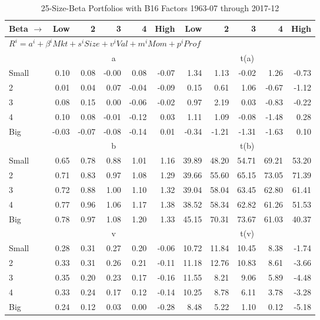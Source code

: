 
\begin{table}[!ht]
\footnotesize
\centering
\caption{25-Size-Beta Portfolios with B16 Factors 1963-07 through 2017-12}
\begin{tabular}{lrrrrrrrrrr}
  \toprule
    
    Beta $\rightarrow$ & Low & 2 & 3 & 4 & High & Low & 2 & 3 & 4 & High  \\ 
  \midrule
  \multicolumn{11}{l}{$R^i=a^i+\beta^iMkt+s^iSize+v^iVal+m^iMom+p^iProf$}  \\
  
     & \multicolumn{5}{c}{a} & \multicolumn{5}{c}{t(a)}   \\
     \cmidrule(r){2-6} \cmidrule(r){7-11} 
    Small  & 0.10  & 0.08  & -0.00  & 0.08  & -0.07  & 1.34  & 1.13  & -0.02  & 1.26  & -0.73   \\
    2  & 0.01  & 0.04  & 0.07  & -0.04  & -0.09  & 0.15  & 0.61  & 1.06  & -0.67  & -1.12   \\
    3  & 0.08  & 0.15  & 0.00  & -0.06  & -0.02  & 0.97  & 2.19  & 0.03  & -0.83  & -0.22   \\
    4  & 0.10  & 0.08  & -0.01  & -0.12  & 0.03  & 1.11  & 1.09  & -0.08  & -1.48  & 0.28   \\
    Big  & -0.03  & -0.07  & -0.08  & -0.14  & 0.01  & -0.34  & -1.21  & -1.31  & -1.63  & 0.10   \\
    
  
     & \multicolumn{5}{c}{b} & \multicolumn{5}{c}{t(b)}   \\
     \cmidrule(r){2-6} \cmidrule(r){7-11} 
    Small  & 0.65  & 0.78  & 0.88  & 1.01  & 1.16  & 39.89  & 48.20  & 54.71  & 69.21  & 53.20   \\
    2  & 0.71  & 0.83  & 0.97  & 1.08  & 1.29  & 39.66  & 55.60  & 65.15  & 73.05  & 71.39   \\
    3  & 0.72  & 0.88  & 1.00  & 1.10  & 1.32  & 39.04  & 58.04  & 63.45  & 62.80  & 61.41   \\
    4  & 0.77  & 0.96  & 1.06  & 1.17  & 1.38  & 38.52  & 58.34  & 62.82  & 61.26  & 51.53   \\
    Big  & 0.78  & 0.97  & 1.08  & 1.20  & 1.33  & 45.15  & 70.31  & 73.67  & 61.03  & 40.37   \\
    
  
     & \multicolumn{5}{c}{v} & \multicolumn{5}{c}{t(v)}   \\
     \cmidrule(r){2-6} \cmidrule(r){7-11} 
    Small  & 0.28  & 0.31  & 0.27  & 0.20  & -0.06  & 10.72  & 11.84  & 10.45  & 8.38  & -1.74   \\
    2  & 0.33  & 0.31  & 0.26  & 0.21  & -0.11  & 11.18  & 12.76  & 10.83  & 8.61  & -3.66   \\
    3  & 0.35  & 0.20  & 0.23  & 0.17  & -0.16  & 11.55  & 8.21  & 9.06  & 5.89  & -4.48   \\
    4  & 0.33  & 0.24  & 0.17  & 0.12  & -0.14  & 10.25  & 8.78  & 6.11  & 3.78  & -3.28   \\
    Big  & 0.24  & 0.12  & 0.03  & 0.00  & -0.28  & 8.48  & 5.22  & 1.10  & 0.12  & -5.18   \\
    

\end{tabular}
\end{table}
